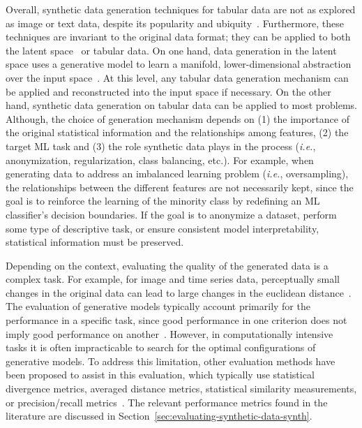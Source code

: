 Overall, synthetic data generation techniques for tabular data are not as
explored as image or text data, despite its popularity and
ubiquity~\cite{fakoor2020fast}. Furthermore, these techniques are invariant to
the original data format; they can be applied to both the latent
space~\cite{devries2017dataset} or tabular data. On one hand, data generation
in the latent space uses a generative model to learn a manifold,
lower-dimensional abstraction over the input
space~\cite{kingma2019introduction}. At
this level, any tabular data generation mechanism can be applied and
reconstructed into the input space if necessary. On the other hand, synthetic
data generation on tabular data can be applied to most problems. Although, the
choice of generation mechanism depends on (1) the importance of the original
statistical information and the relationships among features, (2) the target
ML task and (3) the role synthetic data plays in the process (\textit{i.e.},
anonymization, regularization, class balancing, etc.).  For example, when
generating data to address an imbalanced learning problem (\textit{i.e.},
oversampling), the relationships between the different features are not
necessarily kept, since the goal is to reinforce the learning of the minority
class by redefining an ML classifier's decision boundaries. If the goal is to
anonymize a dataset, perform some type of descriptive task, or ensure
consistent model interpretability, statistical information must be preserved.

Depending on the context, evaluating the quality of the generated data is a
complex task. For example, for image and time series data, perceptually small
changes in the original data can lead to large changes in the euclidean
distance~\cite{assefa2020generating, theis2016note}. The evaluation of
generative models typically account primarily for the performance in a
specific task, since good performance in one criterion does not imply good
performance on another~\cite{theis2016note}. However, in computationally
intensive tasks it is often impracticable to search for the optimal
configurations of generative models. To address this limitation, other
evaluation methods have been proposed to assist in this evaluation, which
typically use statistical divergence metrics, averaged distance metrics,
statistical similarity measurements, or precision/recall
metrics~\cite{chundawat2022tabsyndex, alaa2022faithful}. The relevant
performance metrics found in the literature are discussed in
Section~\ref{sec:evaluating-synthetic-data-synth}.

